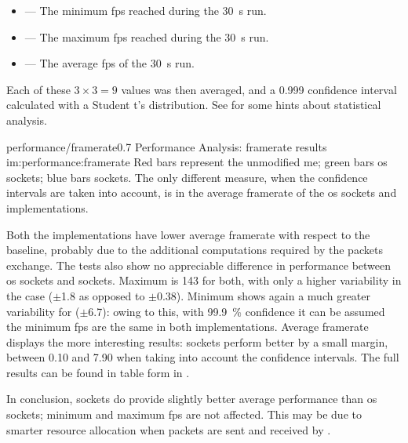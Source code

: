 \begin{itemize}
	\item {} --- The minimum \gls{fps} reached during the \SI{30}{\second} run.
	\item {} --- The maximum \gls{fps} reached during the \SI{30}{\second} run.
	\item {} --- The average \gls{fps} of the \SI{30}{\second} run.
\end{itemize}

\FLOATnoindent Each of these $3\times3=9$ values was then averaged, and a \num{0,999} confidence interval calculated with a Student t's distribution. See  for some hints about statistical analysis.

\begin{image}
	{performance/framerate}{0.7}
	{Performance Analysis: framerate results}
	{im:performance:framerate}
	{}
	{Red bars represent the unmodified \gls{me}; green bars \gls{os} sockets; blue bars  sockets. The only different measure, when the confidence intervals are taken into account, is in the average \gls{framerate} of the \gls{os} sockets and  implementations.}
\end{image}

Both the implementations have lower average \gls{framerate} with respect to the baseline, probably due to the additional computations required by the \glspl{packet} exchange. The tests also show no appreciable difference in performance between \gls{os} sockets and  sockets. Maximum is \SI{143}{\fps} for both, with only a higher variability in the  case ($\pm$\SI{1,8}{\fps} as opposed to $\pm$\SI{0,38}{\fps}). Minimum shows again a much greater variability for  ($\pm$\SI{6,7}{\fps}): owing to this, with \SI{99,9}{\percent} confidence it can be assumed the minimum \gls{fps} are the same in both implementations. Average \gls{framerate} displays the more interesting results:  sockets perform better by a small margin, between \SI{0,10}{\fps} and \SI{7,90}{\fps} when taking into account the confidence intervals. The full results can be found in table form in .

In conclusion,  sockets do provide slightly better average performance than \gls{os} sockets; minimum and maximum \gls{fps} are not affected. This may be due to smarter resource allocation when \glspl{packet} are sent and received by .

